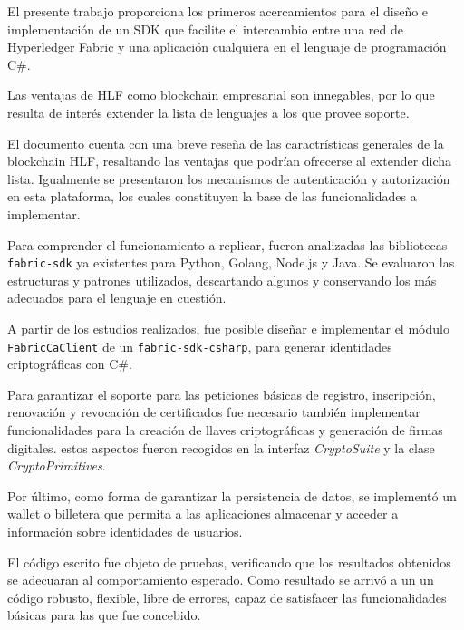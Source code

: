 \begin{conclusions}
 El presente trabajo proporciona los primeros acercamientos para el dise\~no e implementaci\'on de un SDK que facilite el intercambio entre una red de Hyperledger Fabric y una aplicaci\'on cualquiera en el lenguaje de programaci\'on C\#. 
 
 Las ventajas de HLF como blockchain empresarial son innegables, por lo que resulta de inter\'es extender la lista de lenguajes a los que provee soporte.
 
 El documento cuenta con una breve rese\~na de las caractr\'isticas generales de la blockchain HLF, resaltando las ventajas que podr\'ian ofrecerse al extender dicha lista. Igualmente se presentaron los mecanismos de autenticaci\'on y autorizaci\'on en esta plataforma, los cuales constituyen la base de las funcionalidades a implementar.

 Para comprender el funcionamiento a replicar, fueron analizadas las bibliotecas \texttt{fabric-sdk} ya existentes para Python, Golang, Node.js y Java. Se evaluaron las estructuras y patrones utilizados, descartando algunos y conservando los m\'as adecuados para el lenguaje en cuesti\'on.
 
 A partir de los estudios realizados, fue posible dise\~nar e implementar el m\'odulo \texttt{FabricCaClient} de un  \texttt{fabric-sdk-csharp}, para generar identidades criptogr\'aficas con C\#.
 
 Para garantizar el soporte para las peticiones b\'asicas de registro, inscripci\'on, renovaci\'on y revocaci\'on de certificados fue necesario tambi\'en implementar funcionalidades para la creaci\'on de llaves criptogr\'aficas y generaci\'on de firmas digitales. estos aspectos fueron recogidos en la interfaz \emph{CryptoSuite} y la clase \emph{CryptoPrimitives}. 
 
 Por \'ultimo, como forma de garantizar la persistencia de datos, se implement\'o un wallet o billetera que permita a las aplicaciones almacenar y acceder a información sobre identidades de usuarios.
 
 El c\'odigo escrito fue objeto de pruebas, verificando que los resultados obtenidos se adecuaran al comportamiento esperado. Como resultado se arriv\'o a un un código robusto, flexible, libre de errores, capaz de satisfacer las
 funcionalidades básicas para las que fue concebido.
 
\end{conclusions}
